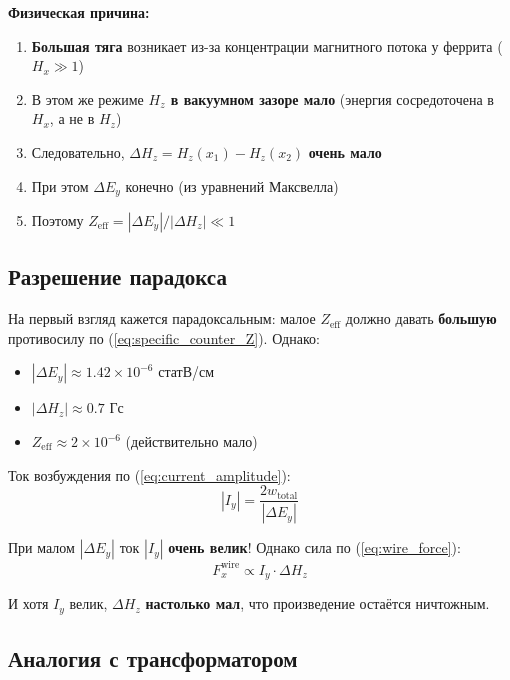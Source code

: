\documentclass[a4paper,12pt]{article}
\begin{document}
\textbf{Физическая причина:}
\begin{enumerate}
    \item \textbf{Большая тяга} возникает из-за концентрации магнитного потока
    у феррита ($H_x \gg 1$)
    \item В этом же режиме \textbf{$H_z$ в вакуумном зазоре мало} (энергия
    сосредоточена в $H_x$, а не в $H_z$)
    \item Следовательно, $\Delta H_z = H_z(x_1) - H_z(x_2)$ \textbf{очень мало}
    \item При этом $\Delta E_y$ конечно (из уравнений Максвелла)
    \item Поэтому $Z_{\text{eff}} = |\Delta E_y|/|\Delta H_z| \ll 1$
\end{enumerate}

\subsection{Разрешение парадокса}

На первый взгляд кажется парадоксальным: малое $Z_{\text{eff}}$ должно давать
\textbf{большую} противосилу по (\ref{eq:specific_counter_Z}). Однако:

\begin{itemize}
    \item $|\Delta E_y| \approx 1.42 \times 10^{-6}$ статВ/см
    \item $|\Delta H_z| \approx 0.7$ Гс
    \item $Z_{\text{eff}} \approx 2 \times 10^{-6}$ (действительно мало)
\end{itemize}

Ток возбуждения по (\ref{eq:current_amplitude}):
\begin{equation}
|I_y| = \frac{2 w_{\text{total}}}{|\Delta E_y|}
\end{equation}

При малом $|\Delta E_y|$ ток $|I_y|$ \textbf{очень велик}! Однако сила по
(\ref{eq:wire_force}):
\begin{equation}
F_x^{\text{wire}} \propto I_y \cdot \Delta H_z
\end{equation}

И хотя $I_y$ велик, $\Delta H_z$ \textbf{настолько мал}, что произведение
остаётся ничтожным.

\subsection{Аналогия с трансформатором}
\end{document}
